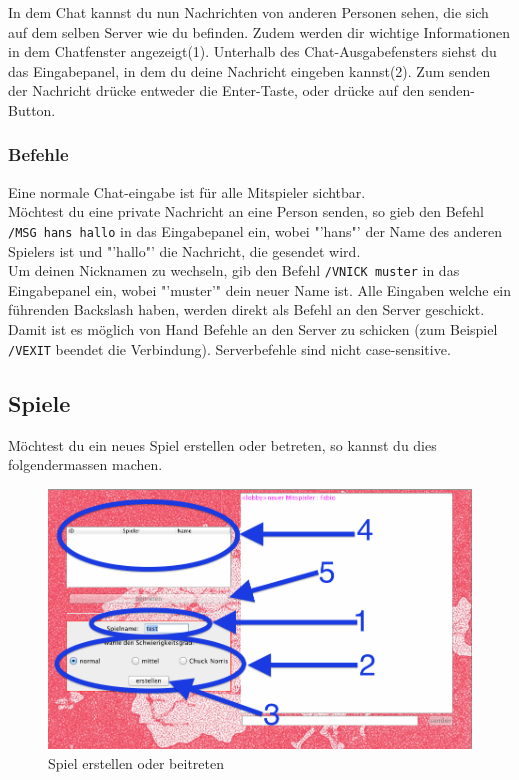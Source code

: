 \documentclass[ngerman, 12pt, pdftex]{scrartcl}[2006/07/30]
\begin{document}
In dem Chat kannst du nun Nachrichten von anderen Personen sehen, die sich auf dem selben Server wie du befinden. Zudem werden dir wichtige Informationen in dem Chatfenster angezeigt(1).
Unterhalb des Chat-Ausgabefensters siehst du das Eingabepanel, in dem du deine Nachricht eingeben kannst(2). Zum senden der Nachricht dr\"{u}cke entweder die Enter-Taste, oder dr\"{u}cke auf den senden-Button.
\subsubsection{Befehle}
Eine normale Chat-eingabe ist f\"{u}r alle Mitspieler sichtbar. \\
M\"{o}chtest du eine private Nachricht an eine Person senden, so gieb den Befehl \lstinline{/MSG hans hallo} in das Eingabepanel ein, wobei "'hans"' der Name des anderen Spielers ist und "'hallo"' die Nachricht, die gesendet wird. \\
Um deinen Nicknamen zu wechseln, gib den Befehl \lstinline{/VNICK muster} in das Eingabepanel ein, wobei "'muster'" dein neuer Name ist.
Alle Eingaben welche ein führenden Backslash haben, werden direkt als Befehl an den Server geschickt. Damit ist es möglich von Hand Befehle an den Server zu schicken (zum Beispiel \lstinline{/VEXIT} beendet die Verbindung). Serverbefehle sind nicht case-sensitive.

\newpage

\subsection{Spiele}
M\"{o}chtest du ein neues Spiel erstellen oder betreten, so kannst du dies folgendermassen machen.

\begin{figure}[h]
\centering
\includegraphics[scale=0.3]{lobby/spiel_erstellen.png}
\caption{Spiel erstellen oder beitreten}
\end{figure}
\end{document}
